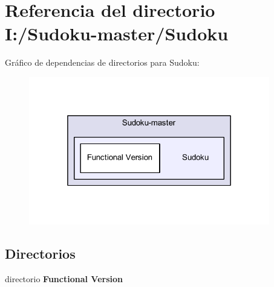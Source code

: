 \section{Referencia del directorio I\-:/\-Sudoku-\/master/\-Sudoku}
\label{dir_16810629fa771c688f96bc8226ff4cfd}
Gráfico de dependencias de directorios para Sudoku\-:
\nopagebreak
\begin{figure}[H]
\begin{center}
\leavevmode
\includegraphics[width=298pt]{dir_16810629fa771c688f96bc8226ff4cfd_dep}
\end{center}
\end{figure}
\subsection*{Directorios}
\begin{DoxyCompactItemize}
\item 
directorio {\bf Functional Version}
\end{DoxyCompactItemize}
